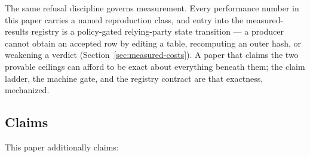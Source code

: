 \documentclass[11pt]{article}
\begin{document}
The same refusal discipline governs measurement. Every performance number
in this paper carries a named reproduction class, and entry into the
measured-results registry is a policy-gated relying-party state
transition --- a producer cannot obtain an accepted row by editing a
table, recomputing an outer hash, or weakening a verdict
(Section~\ref{sec:measured-costs}). A paper that claims the two provable
ceilings can afford to be exact about everything beneath them; the claim
ladder, the machine gate, and the registry contract are that exactness,
mechanized.

\subsection{Claims}

This paper additionally claims:
\end{document}
